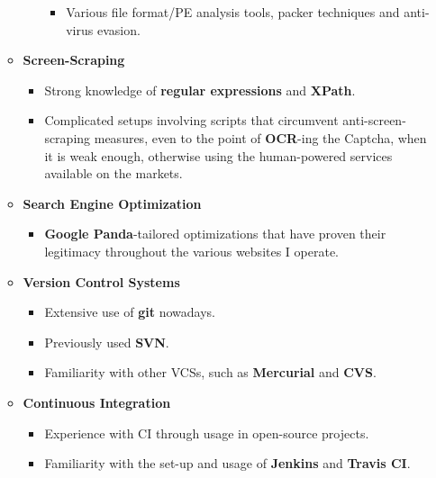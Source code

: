 \documentclass[11pt,a4paper,sans]{moderncv}
\begin{document}
\begin{itemize}
\begin{itemize}
\begin{itemize}
\begin{itemize}
				\item	Various file format/PE analysis tools, packer techniques and anti-virus evasion.
				\end{itemize}
			\end{itemize}
		\item	\textbf{Screen-Scraping}
			\begin{itemize}
			\item	Strong knowledge of \textbf{regular expressions} and \textbf{XPath}.
			\item	Complicated setups involving scripts that circumvent anti-screen-scraping measures, even to the point of \textbf{OCR}-ing the Captcha, when it is weak enough, otherwise using the human-powered services available on the markets.
			\end{itemize}
		\item	\textbf{Search Engine Optimization}
			\begin{itemize}
			\item	\textbf{Google Panda}-tailored optimizations that have proven their legitimacy throughout the various websites I operate.
			\end{itemize}
		\item	\textbf{Version Control Systems}
			\begin{itemize}
			\item	Extensive use of \textbf{git} nowadays.
			\item	Previously used \textbf{SVN}.
			\item	Familiarity with other VCSs, such as \textbf{Mercurial} and \textbf{CVS}.
			\end{itemize}
		\item	\textbf{Continuous Integration}
			\begin{itemize}
				\item	Experience with CI through usage in open-source projects.
				\item	Familiarity with the set-up and usage of \textbf{Jenkins} and \textbf{Travis CI}.
			\end{itemize}
		\end{itemize}
	\end{itemize}

	\vspace{7pt}
\end{document}
